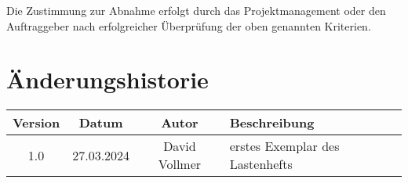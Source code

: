 \documentclass{article}
\begin{document}
Die Zustimmung zur Abnahme erfolgt durch das Projektmanagement oder den Auftraggeber nach erfolgreicher Überprüfung der oben genannten Kriterien.


\section{Änderungshistorie}
\begin{tabular}{|c|c|c|l|}
    \hline
    Version & Datum & Autor & Beschreibung \\
    \hline
    1.0 & 27.03.2024 & David Vollmer & erstes Exemplar des Lastenhefts \\
    \hline
\end{tabular}
\end{document}
